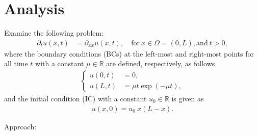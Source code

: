 \documentclass[12pt]{article}
\begin{document}
\section{Analysis}
\begin{example}
	Examine the following problem:
	\begin{align}
		\label{eq:probleminh}
		\partial_t u(x,t) & = \partial_{xx} u(x,t), \quad \text{for} \ x \in \Omega = (0,L),\text{and}\ t>0,
	\end{align}
	where the boundary conditions (BCs) at the left-most and right-most points
	for all time $t$
	with a constant $\mu \in \mathbb{R}$ are defined, respectively, as follows
	\begin{align}
		\begin{cases}
			u(0,t) & =0,                                                        \\
			u(L,t) & = \mu t \exp(-\mu t),                                     
		\end{cases}
	\end{align}
	and the initial condition (IC) with a constant $u_{0} \in \mathbb{R}$ is given as 
	\begin{align}
		u(x,0) = u_0 \ x(L-x).
	\end{align}
\end{example}
Approach:
\end{document}
